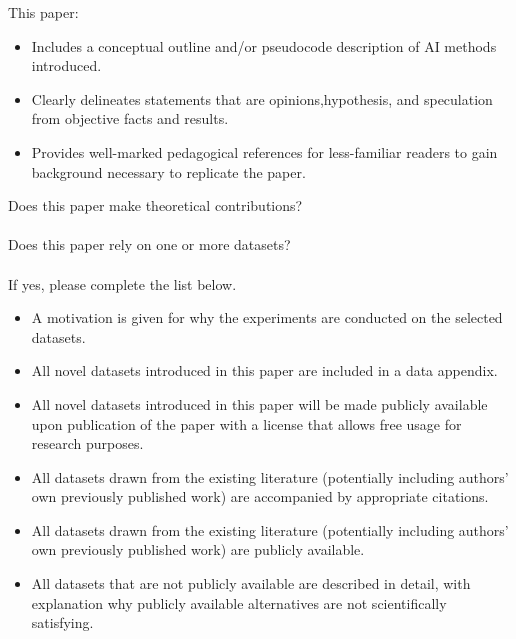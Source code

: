 
This paper:

\begin{itemize}
    
    \item Includes a conceptual outline and/or pseudocode description of AI methods introduced. \yes 
    
    \item Clearly delineates statements that are opinions,hypothesis, and speculation from objective facts and results. \yes 
    
    \item Provides well-marked pedagogical references for less-familiar readers to gain background necessary to replicate the paper. \yes 

\end{itemize}

\noindent Does this paper make theoretical contributions? \no \\ \\ 

\noindent Does this paper rely on one or more datasets? \yes \\ \\ 

\noindent If yes, please complete the list below.

\begin{itemize}

    \item A motivation is given for why the experiments are conducted on the selected datasets. \yes 
    
    \item All novel datasets introduced in this paper are included in a data appendix. \na 
    
    \item All novel datasets introduced in this paper will be made publicly available upon publication of the paper with a license that allows free usage for research purposes. \na 
    
    \item All datasets drawn from the existing literature (potentially including authors’ own previously published work) are accompanied by appropriate citations. \yes 
    
    \item All datasets drawn from the existing literature (potentially including authors’ own previously published work) are publicly available. \yes 
    
    \item All datasets that are not publicly available are described in detail, with explanation why publicly available alternatives are not scientifically satisfying. \na 

\end{itemize}


